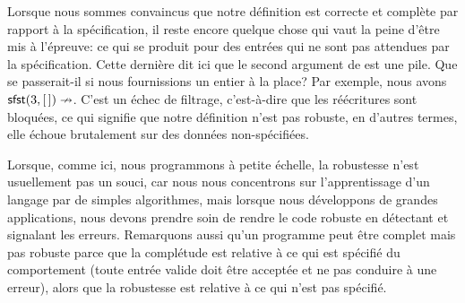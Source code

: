 Lorsque nous sommes convaincus que notre définition est
correcte et complète par rapport à
la spécification, il reste encore quelque chose qui vaut la peine
d'être mis à l'épreuve: ce qui se produit pour des entrées qui ne sont
pas attendues par la spécification. Cette dernière dit ici que le
second argument de  est une pile. Que se passerait-il si
nous fournissions un entier à la place?  Par exemple, nous avons
\(\textsf{sfst}(3,[\,]) \nrightarrow\). C'est un échec de filtrage,
c'est-à-dire que les réécritures sont bloquées, ce qui signifie que
notre définition n'est pas robuste, en d'autres
termes, elle échoue brutalement sur des données non-spécifiées.

Lorsque, comme ici, nous programmons à petite échelle, la robustesse
n'est usuellement pas un souci, car nous nous concentrons sur
l'apprentissage d'un langage par de simples algorithmes, mais lorsque
nous développons de grandes applications, nous devons prendre soin de
rendre le code robuste en détectant et signalant les
erreurs. Remarquons aussi qu'un programme peut être
complet mais pas robuste parce que
la complétude est relative à ce qui est spécifié du comportement
(toute entrée valide doit être acceptée et ne pas conduire à une
erreur), alors que la robustesse est relative à ce qui n'est pas
spécifié.

